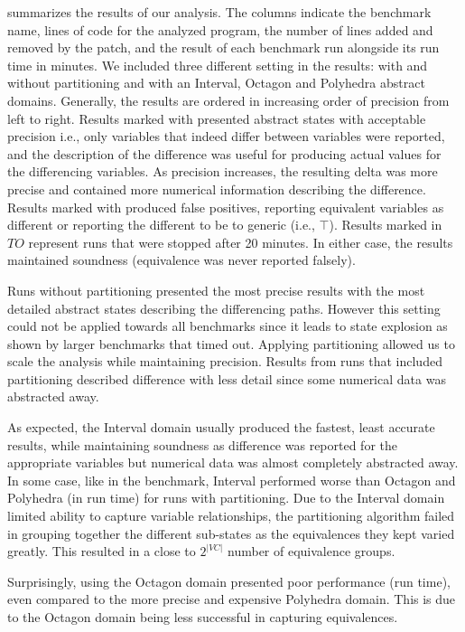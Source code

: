  summarizes the results of our analysis. The columns indicate the benchmark name, lines of code for the analyzed program, the number of lines added and removed by the patch, and the result of each benchmark run alongside its run time in minutes. We included three different setting in the results: with and without partitioning and with an Interval, Octagon and Polyhedra abstract domains. Generally, the results are ordered in increasing order of precision from left to right. Results marked with \checkmark presented abstract states with acceptable precision i.e., only variables that indeed differ between variables were reported, and the description of the difference was useful for producing actual values for the differencing variables. As precision increases, the resulting delta was more precise and contained more numerical information describing the difference. Results marked with \xmark produced false positives, reporting equivalent variables as different or reporting the different to be to generic (i.e., $\top$). Results marked in $TO$ represent runs that were stopped after 20 minutes. In either case, the results maintained soundness (equivalence was never reported falsely).

Runs without partitioning presented the most precise results with the most detailed abstract states describing the differencing paths. However this setting could not be applied towards all benchmarks since it leads to state explosion as shown by larger benchmarks that timed out. Applying partitioning allowed us to scale the analysis while maintaining precision. Results from runs that included partitioning described difference with less detail since some numerical data was abstracted away.

As expected, the Interval domain usually produced the fastest, least accurate results, while maintaining soundness as difference was reported for the appropriate variables but numerical data was almost completely abstracted away. In some case, like in the  benchmark, Interval performed worse than Octagon and Polyhedra (in run time) for runs with partitioning. Due to the Interval domain limited ability to capture variable relationships, the partitioning algorithm failed in grouping together the different sub-states as the equivalences they kept varied greatly. This resulted in a close to $2^{|VC|}$ number of equivalence groups.

Surprisingly, using the Octagon domain presented poor performance (run time), even compared to the more precise and expensive Polyhedra domain. This is due to the Octagon domain being less successful in capturing equivalences.

